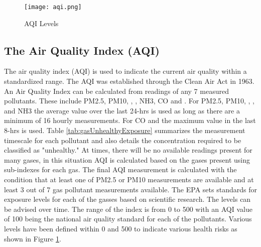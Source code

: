 \begin{figure}[H]
\centering
\texttt{[image: aqi.png]}
\caption{AQI Levels}
\label{fig:aqiLevels}
\end{figure}


\subsection{The Air Quality Index (AQI)}
The air quality index (AQI) is used to indicate the current air quality within a standardized range. The AQI was established through the Clean Air Act in 1963. An Air Quality Index can be calculated from readings of any 7 measured pollutants. These include PM2.5, PM10, \sdo, \nox, NH3, CO and \ozone. For PM2.5, PM10, \sdo, \nox, and NH3 the average value over the last 24-hrs is used as long as there are a minimum of 16 hourly measurements. For CO and \ozone the maximum value in the last 8-hrs is used. Table \ref{tab:gasUnhealthyExposure} summarizes the measurement timescale for each pollutant and also details the concentration required to be classified as "unhealthy." At times, there will be no available readings present for many gases, in this situation AQI is calculated based on the gases present using sub-indexes for each gas. The final AQI measurement is calculated with the condition that at least one of PM2.5 or PM10 measurements are available and at least 3 out of 7 gas pollutant measurements available. The EPA sets standards for exposure levels for each of the gasses based on scientific research. The levels can be advised over time. The range of the index is from 0 to 500 with an AQI value of 100 being the national air quality standard for each of the pollutants. Various levels have been defined within 0 and 500 to indicate various health risks as shown in Figure \ref{fig:aqiLevels}. 


